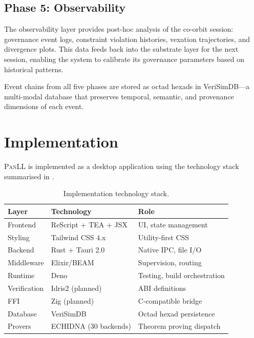 \documentclass[11pt,a4paper]{article}
\newcommand{\panll}{\textsc{PanLL}}
\newcommand{\tea}{\textsc{TEA}}
\begin{document}
\subsection{Phase 5: Observability}

The observability layer provides post-hoc analysis of the co-orbit
session: governance event logs, constraint violation histories,
vexation trajectories, and divergence plots. This data feeds back
into the substrate layer for the next session, enabling the system
to calibrate its governance parameters based on historical patterns.

Event chains from all five phases are stored as octad hexads in
VeriSimDB---a multi-modal database that preserves temporal,
semantic, and provenance dimensions of each event.

\section{Implementation}\label{sec:implementation}

\panll{} is implemented as a desktop application using the
technology stack summarised in .

\begin{table}[t]
\centering
\caption{Implementation technology stack.}\label{tab:stack}
\begin{tabular}{@{}lll@{}}
\toprule
\textbf{Layer} & \textbf{Technology} & \textbf{Role} \\
\midrule
Frontend & ReScript + \tea{} + JSX & UI, state management \\
Styling & Tailwind CSS 4.x & Utility-first CSS \\
Backend & Rust + Tauri 2.0 & Native IPC, file I/O \\
Middleware & Elixir/BEAM & Supervision, routing \\
Runtime & Deno & Testing, build orchestration \\
Verification & Idris2 (planned) & ABI definitions \\
FFI & Zig (planned) & C-compatible bridge \\
Database & VeriSimDB & Octad hexad persistence \\
Provers & ECHIDNA (30 backends) & Theorem proving dispatch \\
\bottomrule
\end{tabular}
\end{table}
\end{document}
